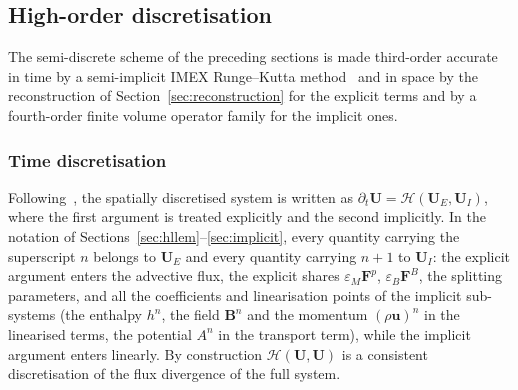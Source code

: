 \documentclass[a4paper,fleqn]{cas-sc}
\theoremstyle{remark}
\newcommand{\eps}{\varepsilon}
\newcommand{\epsM}{\eps_{M}}
\newcommand{\epsB}{\eps_{B}}
\newcommand{\Bb}{\mathbf{B}}
\newcommand{\FF}{\mathbf{F}}
\begin{document}
\subsection{High-order discretisation}
\label{sec:highorder}

The semi-discrete scheme of the preceding sections is made third-order accurate
in time by a semi-implicit IMEX Runge--Kutta
method~\cite{RKIMEX,BoscheriPareschi2021} and in space by the
reconstruction of Section~\ref{sec:reconstruction} for the explicit terms and by a
fourth-order finite volume operator family for the implicit ones.

\subsubsection{Time discretisation}
\label{sec:time}
Following~\cite{BoscheriPareschi2021}, the spatially discretised system is written
as $\partial_t\mathbf{U}=\mathcal H(\mathbf{U}_E,\mathbf{U}_I)$, where the first
argument is treated explicitly and the second implicitly. In the notation of
Sections~\ref{sec:hllem}--\ref{sec:implicit}, every quantity carrying the
superscript $n$ belongs to $\mathbf{U}_E$ and every quantity carrying $n+1$ to
$\mathbf{U}_I$: the explicit argument enters the advective flux, the explicit
shares $\epsM\FF^{p}$, $\epsB\FF^{B}$, the splitting parameters, and all the
coefficients and linearisation points of the implicit sub-systems (the enthalpy
$h^{n}$, the field $\Bb^{n}$ and the momentum $(\rho\mathbf{u})^{n}$ in the linearised
terms, the potential $A^{n}$ in the transport term), while the implicit argument
enters linearly. By construction $\mathcal H(\mathbf{U},\mathbf{U})$ is a
consistent discretisation of the flux divergence of the full system.
\end{document}
